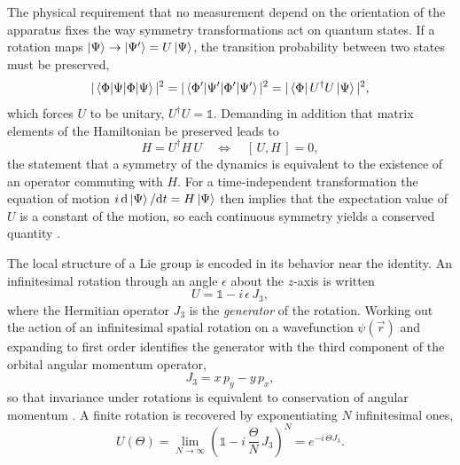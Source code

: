 The physical requirement that no measurement depend on the orientation of the
apparatus fixes the way symmetry transformations act on quantum states. If a
rotation maps $\ket{\Psi} \to \ket{\Psi'} = U\ket{\Psi}$, the transition probability
between two states must be preserved,
\begin{equation}
    |\braket{\Phi|\Psi}|^2
    = |\braket{\Phi'|\Psi'}|^2
    = |\bra{\Phi} U^\dagger U \ket{\Psi}|^2,
\end{equation}
which forces $U$ to be unitary, $U^\dagger U = \mathbb{1}$. Demanding in addition
that matrix elements of the Hamiltonian be preserved leads to
\begin{equation}
    H = U^\dagger H\, U
    \quad\Longleftrightarrow\quad
    [\,U, H\,] = 0 ,
\end{equation}
the statement that a symmetry of the dynamics is equivalent to the existence of an
operator commuting with $H$. For a time-independent transformation the equation of
motion $i\,\mathrm{d}\ket{\Psi}/\mathrm{d}t = H\ket{\Psi}$ then implies that the
expectation value of $U$ is a constant of the motion, so each continuous symmetry
yields a conserved quantity \cite[Ch.~6]{Amsler2018}.

The local structure of a Lie group is encoded in its behavior near the identity. An
infinitesimal rotation through an angle $\epsilon$ about the $z$-axis is written
\begin{equation}
    U = \mathbb{1} - i\,\epsilon\, J_3 ,
    \label{eq:infinitesimal}
\end{equation}
where the Hermitian operator $J_3$ is the \emph{generator} of the rotation. Working
out the action of an infinitesimal spatial rotation on a wavefunction
$\psi(\vec{r})$ and expanding to first order identifies the generator with the third
component of the orbital angular momentum operator,
\begin{equation}
    J_3 = x\,p_y - y\,p_x ,
\end{equation}
so that invariance under rotations is equivalent to conservation of angular
momentum \cite[Ch.~6]{Amsler2018}. A finite rotation is recovered by exponentiating
$N$ infinitesimal ones,
\begin{equation}
    U(\Theta) = \lim_{N\to\infty}\!\left(\mathbb{1} - i\,\frac{\Theta}{N}\,J_3\right)^{\!N}
    = e^{-i\,\Theta J_3}.
\end{equation}


